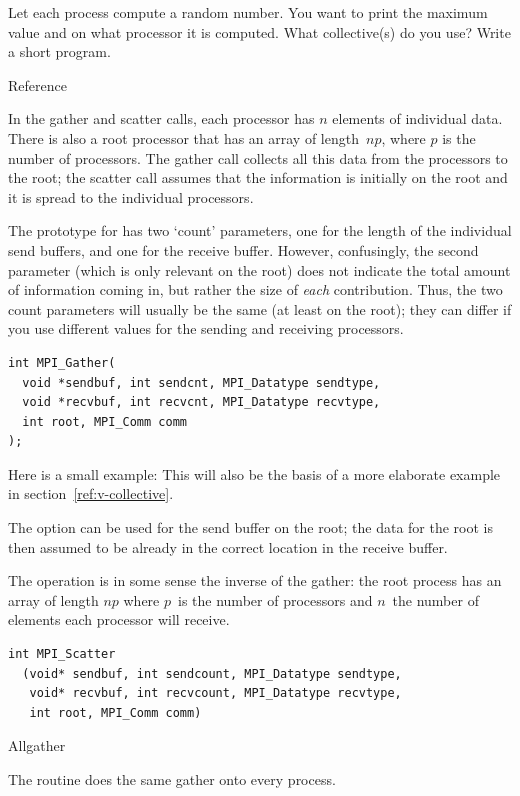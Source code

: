 \begin{exercise}
  \label{ex:randomwhere}
  Let each process compute a random number.
  You want to print the maximum value and on what processor it
  is computed. What collective(s) do you use? Write a short program.
\end{exercise}

 {Reference}

In the gather and scatter calls, each processor has $n$ elements of individual
data. There is also a root processor that has an array of length~$np$, where $p$
is the number of processors. The gather call collects all this data from the 
processors to the root; the scatter call assumes that the information is 
initially on the root and it is spread to the individual processors.

The prototype for  has two `count' parameters, one
for the length of the individual send buffers, and one for the receive buffer.
However, confusingly, the second parameter (which is only relevant on the root)
does not indicate the total amount of information coming in, but
rather the size of \emph{each} contribution. Thus, the two count parameters
will usually be the same (at least on the root); they can differ if you 
use different  values for the sending and receiving
processors.
\begin{verbatim}
int MPI_Gather(
  void *sendbuf, int sendcnt, MPI_Datatype sendtype,
  void *recvbuf, int recvcnt, MPI_Datatype recvtype,
  int root, MPI_Comm comm
);
\end{verbatim}

Here is a small example:
This will also be the basis of a more elaborate example in
section~\ref{ref:v-collective}.

The  option can be used for the send buffer on the root;
the data for the root is then assumed to be already in the correct location
in the receive buffer.

The  operation is in some sense the inverse of the gather:
the root process has an array of length $np$ where $p$~is the number of processors
and $n$~the number of elements each processor will receive.
\begin{verbatim}
int MPI_Scatter
  (void* sendbuf, int sendcount, MPI_Datatype sendtype, 
   void* recvbuf, int recvcount, MPI_Datatype recvtype, 
   int root, MPI_Comm comm) 
\end{verbatim}

 {Allgather}

The  routine does the same gather onto
every process.
%
